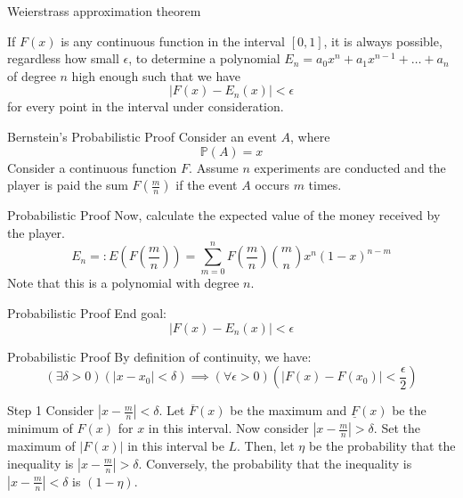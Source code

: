 \documentclass[mathserif,serif]{beamer}
\begin{document}
\begin{frame}{Weierstrass approximation theorem}
\begin{theorem}
If $F(x)$ is any continuous function in the interval $[0,1]$, it is always possible, regardless how small $\epsilon$, to determine a polynomial $E_n=a_0x^n+a_1x^{n-1}+\dots+a_n$ of degree $n$ high enough such that we have
\begin{equation*}
    |F(x)-E_n(x)|<\epsilon
\end{equation*}
for every point in the interval under consideration.
\end{theorem}
\end{frame}

\begin{frame}{Bernstein's Probabilistic Proof}
Consider an event $A$, where
$$\mathbb{P}(A)=x$$
Consider a continuous function $F$.
\newline 
Assume $n$ experiments are conducted and the player is paid the sum $F(\frac{m}{n})$ if the event $A$ occurs $m$ times.    
\end{frame}

\begin{frame}{Probabilistic Proof}
Now, calculate the expected value of the money received by the player.
\begin{equation*}
      E_n =:E(F(\frac{m}{n})) = \sum_{m=0}^{n} F \left( \frac{m}{n} \right) \binom{m}{n} x^n (1-x)^{n-m}
\end{equation*}
Note that this is a polynomial with degree $n$.
\end{frame}

\begin{frame}{Probabilistic Proof}
End goal:
\begin{equation*}
    |F(x)-E_n(x)|<\epsilon
\end{equation*}
\end{frame}

\begin{frame}{Probabilistic Proof}
By definition of continuity, we have:
\begin{equation*}
    (\exists\delta>0)(|x-x_0|<\delta)\implies(\forall\epsilon>0)(|F(x)-F(x_0)|<\frac{\epsilon}{2})
\end{equation*}
\end{frame}

\begin{frame}{Step 1}
Consider $|x-\frac{m}{n}|<\delta$.
\newline
Let $\overline{F}(x)$ be the maximum and $\underline{F}(x)$ be the minimum of $F(x)$ for $x$ in this interval.
\newline
Now consider $|x-\frac{m}{n}|>\delta$.
\newline
Set the maximum of $|F(x)|$ in this interval be $L$.
\newline
Then, let $\eta$ be the probability that the inequality is $|x-\frac{m}{n}|>\delta$. Conversely, the probability that the inequality is $|x-\frac{m}{n}|<\delta$ is $(1-\eta)$.
\end{frame}
\end{document}
